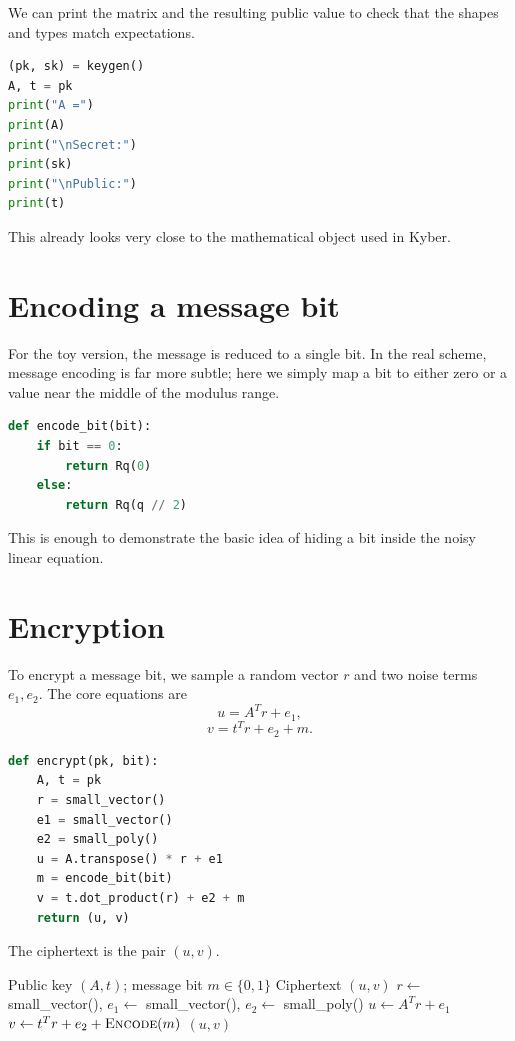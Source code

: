 We can print the matrix and the resulting public value to check that the shapes and types match expectations.

\begin{lstlisting}[language=Python]
(pk, sk) = keygen()
A, t = pk
print("A =")
print(A)
print("\nSecret:")
print(sk)
print("\nPublic:")
print(t)
\end{lstlisting}

This already looks very close to the mathematical object used in Kyber.

\section{Encoding a message bit}

For the toy version, the message is reduced to a single bit. In the real scheme, message encoding is far more subtle; here we simply map a bit to either zero or a value near the middle of the modulus range.

\begin{lstlisting}[language=Python]
def encode_bit(bit):
    if bit == 0:
        return Rq(0)
    else:
        return Rq(q // 2)
\end{lstlisting}

This is enough to demonstrate the basic idea of hiding a bit inside the noisy linear equation.

\section{Encryption}

To encrypt a message bit, we sample a random vector $r$ and two noise terms $e_1,e_2$. The core equations are
\[
u = A^T r + e_1,
\]
\[
v = t^T r + e_2 + m.
\]

\begin{lstlisting}[language=Python]
def encrypt(pk, bit):
    A, t = pk
    r = small_vector()
    e1 = small_vector()
    e2 = small_poly()
    u = A.transpose() * r + e1
    m = encode_bit(bit)
    v = t.dot_product(r) + e2 + m
    return (u, v)
\end{lstlisting}

The ciphertext is the pair $(u,v)$.

\begin{algorithm}[H]
\caption{Toy Encrypt}
\label{alg:toy-encrypt}
\begin{algorithmic}[1]
\Require Public key $(A,t)$; message bit $m\in\{0,1\}$
\Ensure Ciphertext $(u,v)$
\State $r \gets$ small\_vector(), \quad $e_1 \gets$ small\_vector(), \quad $e_2 \gets$ small\_poly()
\State $u \gets A^{T} r + e_1$
\State $v \gets t^{T} r + e_2 + \textsc{Encode}(m)$ 
\State \Return $(u,v)$
\end{algorithmic}
\end{algorithm}

